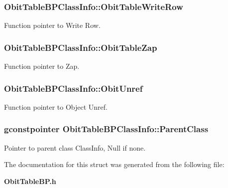 \subsubsection{ {\bf Obit\-Table\-BPClass\-Info::Obit\-Table\-Write\-Row}}\label{structObitTableBPClassInfo_o26}


Function pointer to Write Row. 

\subsubsection{ {\bf Obit\-Table\-BPClass\-Info::Obit\-Table\-Zap}}\label{structObitTableBPClassInfo_o19}


Function pointer to Zap. 

\subsubsection{ {\bf Obit\-Table\-BPClass\-Info::Obit\-Unref}}\label{structObitTableBPClassInfo_o11}


Function pointer to Object Unref. 

\subsubsection{\setlength{\rightskip}{0pt plus 5cm}gconstpointer {\bf Obit\-Table\-BPClass\-Info::Parent\-Class}}\label{structObitTableBPClassInfo_o3}


Pointer to parent class Class\-Info, Null if none. 



The documentation for this struct was generated from the following file:\begin{CompactItemize}
\item 
{\bf Obit\-Table\-BP.h}\end{CompactItemize}
